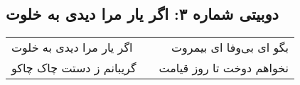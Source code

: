 \begin{center}
\section*{دوبیتی شماره ۳: اگر یار مرا دیدی به خلوت}
\label{sec:003}
\begin{longtable}{l p{0.5cm} r}
اگر یار مرا دیدی به خلوت
&&
بگو ای بی‌وفا ای بیمروت
\\
گریبانم ز دستت چاک چاکو
&&
نخواهم دوخت تا روز قیامت
\\
\end{longtable}
\end{center}
